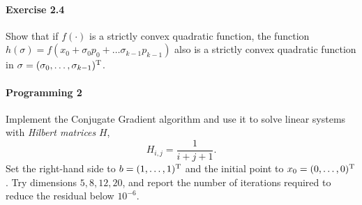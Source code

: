 \paragraph{Exercise 2.4}  %
Show that if $f(\cdot)$ is a strictly convex quadratic function, the function
$h(\sigma)=f(x_0+\sigma_0 p_0 + \dots \sigma_{k-1}p_{k-1})$ also is a strictly
convex quadratic function in $\sigma=(\sigma_0,\dots,\sigma_{k-1})^{\text{\upshape T}}$.

\paragraph{Programming 2} %
Implement the Conjugate Gradient algorithm and use it to solve linear systems
with \emph{Hilbert matrices} $H$,
\[
H_{i,j} = \frac{1}{i+j+1}.
\]
Set the right-hand side to $b=(1,\dots,1)^{\text{\upshape T}}$ and the initial point to $x_0=(0,\dots,0)^{\text{\upshape T}}$. Try dimensions $5, 8, 12, 20$, and report the number of iterations required to reduce the residual below $10^{-6}$.


